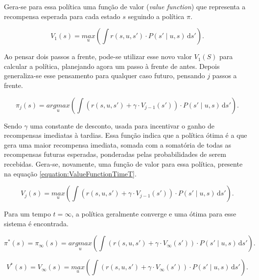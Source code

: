 Gera-se para essa política uma função de valor (\textit{value function}) que representa a recompensa esperada para cada estado $ s $ seguindo a política $ \pi $.

\begin{equation}
    V_1 \left( s \right) = \underset{u}{max} \left( \int \! r \left( s, u, s' \right) \cdot P \left( s' \mid u, s \right) \, \mathrm{d}s' \right).
\end{equation}

Ao pensar dois passos a frente, pode-se utilizar esse novo valor $ V_1 \left( S \right) $ para calcular a política, planejando agora um passo à frente de antes. Depois generaliza-se esse pensamento para qualquer caso futuro, pensando $ j $ passos a frente.

\begin{equation}
    \pi_j \left( s \right) = \underset{u}{argmax} \left( \int \! \left( r \left( s, u, s' \right) + \gamma \cdot V_{j-1} \left( s' \right) \right) \cdot P \left( s' \mid u, s \right) \, \mathrm{d}s' \right).
\end{equation}

Sendo $ \gamma $ uma constante de desconto, usada para incentivar o ganho de recompensas imediatas à tardias. Essa função indica que a política ótima é a que gera uma maior recompensa imediata, somada com a somatória de todas as recompensas futuras esperadas, ponderadas pelas probabilidades de serem recebidas. Gera-se, novamente, uma função de valor para essa política, presente na equação \ref{equation:ValueFunctionTimeT}.

\begin{equation} \label{equation:ValueFunctionTimeT}
    V_j \left( s \right) = \underset{u}{max} \left( \int \! \left( r \left( s, u, s' \right) + \gamma \cdot V_{j-1} \left( s' \right) \right) \cdot P \left( s' \mid u, s \right) \, \mathrm{d}s' \right).
\end{equation}

Para um tempo $ t = \infty $, a política geralmente converge e uma ótima para esse sistema é encontrada.

\begin{equation}
    \pi^* \left( s \right) = \pi_\infty \left( s \right) = \underset{u}{argmax} \left( \int \! \left( r \left( s, u, s' \right) + \gamma \cdot V_\infty \left( s' \right) \right) \cdot P \left( s' \mid u, s \right) \, \mathrm{d}s' \right).
\end{equation}

\begin{equation} \label{equation:ValueFunctionMDP}
    V^* \left( s \right) = V_\infty \left( s \right) = \underset{u}{max} \left( \int \! \left( r \left( s, u, s' \right) + \gamma \cdot V_\infty \left( s' \right) \right) \cdot P \left( s' \mid u, s \right) \, \mathrm{d}s' \right).
\end{equation}


